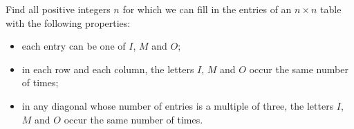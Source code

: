 Find all positive integers $n$ for which we can fill in the entries of an $n \times n$ table with the following properties:

\begin{itemize}
  \item each entry can be one of $I$, $M$ and $O$;
  \item in each row and each column, the letters $I$, $M$ and $O$ occur the same number of times;
  \item in any diagonal whose number of entries is a multiple of three, the letters $I$, $M$ and $O$ occur the same number of times.
\end{itemize}
